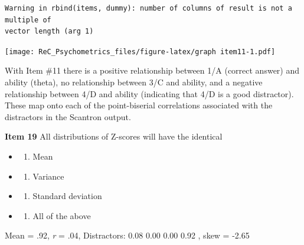 \documentclass[
  english,
]{book}
\newenvironment{Shaded}{\begin{snugshade}}{\end{snugshade}}
\newcommand{\DataTypeTok}[1]{\textcolor[rgb]{0.13,0.29,0.53}{#1}}
\newcommand{\DecValTok}[1]{\textcolor[rgb]{0.00,0.00,0.81}{#1}}
\newcommand{\KeywordTok}[1]{\textcolor[rgb]{0.13,0.29,0.53}{\textbf{#1}}}
\newcommand{\NormalTok}[1]{#1}
\newcommand{\OperatorTok}[1]{\textcolor[rgb]{0.81,0.36,0.00}{\textbf{#1}}}
\providecommand{\tightlist}{%
  \setlength{\itemsep}{0pt}\setlength{\parskip}{0pt}}
\begin{document}
\begin{verbatim}
Warning in rbind(items, dummy): number of columns of result is not a multiple of
vector length (arg 1)
\end{verbatim}

\texttt{[image: ReC\_Psychometrics\_files/figure-latex/graph item11-1.pdf]}

With Item \#11 there is a positive relationship between 1/A (correct answer) and ability (theta), no relationship between 3/C and ability, and a negative relationship between 4/D and ability (indicating that 4/D is a good distractor). These map onto each of the point-biserial correlations associated with the distractors in the Scantron output.

\textbf{Item 19} All distributions of Z-scores will have the identical

\begin{itemize}
\item
  \begin{enumerate}
  \def\labelenumi{\alph{enumi})}
  \tightlist
  \item
    Mean
  \end{enumerate}
\item
  \begin{enumerate}
  \def\labelenumi{\alph{enumi})}
  \setcounter{enumi}{1}
  \tightlist
  \item
    Variance
  \end{enumerate}
\item
  \begin{enumerate}
  \def\labelenumi{\alph{enumi})}
  \setcounter{enumi}{2}
  \tightlist
  \item
    Standard deviation
  \end{enumerate}
\item
  \begin{enumerate}
  \def\labelenumi{\alph{enumi})}
  \setcounter{enumi}{3}
  \tightlist
  \item
    All of the above
  \end{enumerate}
\end{itemize}

Mean = .92, \emph{r} = .04, Distractors: 0.08 0.00 0.00 0.92 , skew = -2.65

\begin{Shaded}
\end{Shaded}
\end{document}
